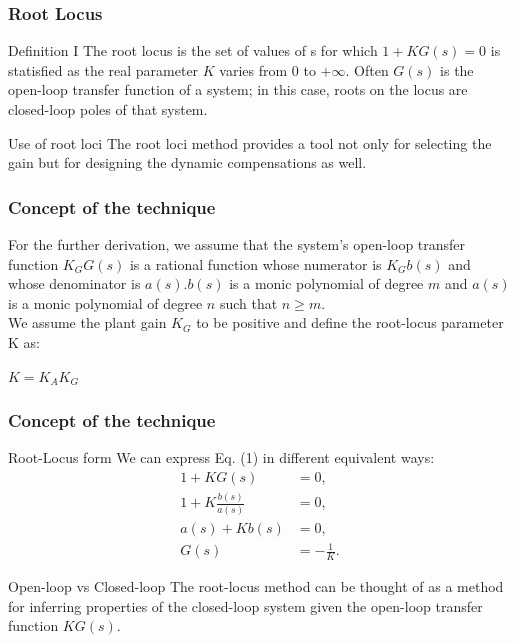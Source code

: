 \begin{frame}
\frametitle{Root Locus}
	\begin{block}{Definition I}
		The root locus is the set of values of s for which $1 + KG(s) = 0$ is statisfied as the real parameter $K$ varies from $0$ to $+\infty$. Often $G(s)$ is the open-loop transfer function of a system; in this case, roots on the locus are closed-loop poles of that system.
	\end{block}
	\begin{block}{Use of root loci}
		The root loci method provides a tool not only for selecting the gain but for designing the dynamic compensations as well.
	\end{block}
\end{frame}

\begin{frame}
\frametitle{Concept of the technique}
	For the further derivation, we assume that the system's open-loop transfer function $K_GG(s)$ is a rational function whose numerator is $K_Gb(s)$ and whose denominator is $a(s)$.$b(s)$ is a monic polynomial of degree $m$ and $a(s)$ is a monic polynomial of degree $n$ such that $n \geq m$.\\
	\vspace{1em}
	We assume the plant gain $K_G$ to be positive and define the root-locus parameter K as:
	\begin{center}
		$K = K_AK_G$
	\end{center}
\end{frame}

\begin{frame}
\frametitle{Concept of the technique}
\begin{block}{Root-Locus form}
	We can express Eq. (1) in different equivalent ways:
	\vspace{-1em}
	\begin{align*}
		1 + KG(s) &= 0,\\
		1 + K\frac{b(s)}{a(s)} &= 0,\\
		a(s) + Kb(s) &=0,\\
		G(s) & = -\frac{1}{K}.
	\end{align*}
\end{block}

\begin{alertblock}{Open-loop vs Closed-loop}
	The root-locus method can be thought of as a method for inferring properties of the closed-loop system given the open-loop transfer function $KG(s)$.
\end{alertblock}
\end{frame}

